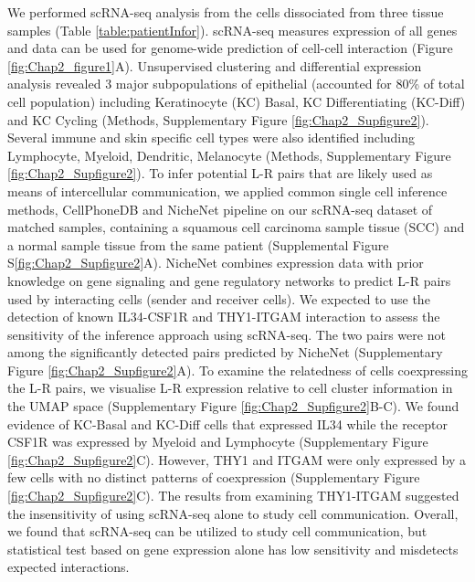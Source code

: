 We performed scRNA-seq analysis from the cells dissociated from three tissue samples (Table \ref{table:patientInfor}). scRNA-seq measures expression of all genes and data can be used for genome-wide prediction of cell-cell interaction (Figure \ref{fig:Chap2_figure1}A). Unsupervised clustering and differential expression analysis revealed 3 major subpopulations of epithelial (accounted for 80\% of total cell population) including Keratinocyte (KC) Basal, KC Differentiating (KC-Diff) and KC Cycling (Methods, Supplementary Figure \ref{fig:Chap2_Supfigure2}). Several immune and skin specific cell types were also identified including Lymphocyte, Myeloid, Dendritic, Melanocyte (Methods, Supplementary Figure \ref{fig:Chap2_Supfigure2}). To infer potential L-R pairs that are likely used as means of intercellular communication, we applied common single cell inference methods, CellPhoneDB \cite{efremova2020cellphonedb} and NicheNet pipeline \cite{browaeys2020nichenet} on our scRNA-seq dataset of matched samples, containing a squamous cell carcinoma sample tissue (SCC)  and a normal sample tissue from the same patient (Supplemental Figure S\ref{fig:Chap2_Supfigure2}A). NicheNet combines expression data with prior knowledge on gene signaling and gene regulatory networks to predict L-R pairs used by interacting cells (sender and receiver cells). We expected to use the detection of known IL34-CSF1R \cite{lin2008discovery} and THY1-ITGAM \cite{wetzel2004human} interaction to assess the sensitivity of the inference approach using scRNA-seq. The two pairs were not among the significantly detected pairs predicted by NicheNet (Supplementary Figure \ref{fig:Chap2_Supfigure2}A). To examine the relatedness of cells coexpressing the L-R pairs, we visualise L-R expression relative to cell cluster information in the UMAP space (Supplementary Figure \ref{fig:Chap2_Supfigure2}B-C). We found evidence of KC-Basal and KC-Diff cells that expressed IL34 while the receptor CSF1R was expressed by Myeloid and Lymphocyte (Supplementary Figure \ref{fig:Chap2_Supfigure2}C). However, THY1 and ITGAM were only expressed by a few cells with no distinct patterns of coexpression (Supplementary Figure \ref{fig:Chap2_Supfigure2}C). The results from examining THY1-ITGAM suggested the insensitivity of using scRNA-seq alone to study cell communication. Overall, we found that scRNA-seq can be utilized to study cell communication, but statistical test based on gene expression alone has low sensitivity and misdetects expected interactions.  

